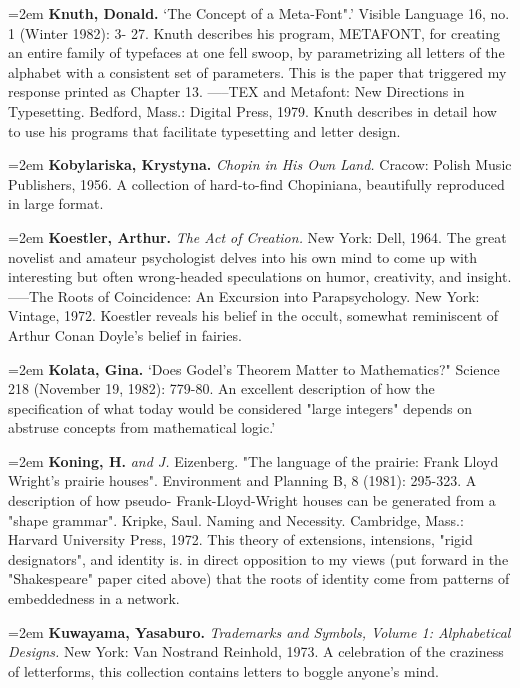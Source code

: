 \par\noindent\hangindent=2em {\bf Knuth, Donald.} `The Concept of a Meta-Font".' Visible Language 16, no. 1 (Winter 1982): 3- 27. Knuth describes his program, METAFONT, for creating an entire family of typefaces at one fell swoop, by parametrizing all letters of the alphabet with a consistent set of parameters. This is the paper that triggered my response printed as Chapter 13. -----TEX and Metafont: New Directions in Typesetting. Bedford, Mass.: Digital Press, 1979. Knuth describes in detail how to use his programs that facilitate typesetting and letter design.

\par\noindent\hangindent=2em {\bf Kobylariska, Krystyna.} {\it Chopin in His Own Land.} Cracow: Polish Music Publishers, 1956. A collection of hard-to-find Chopiniana, beautifully reproduced in large format.

\par\noindent\hangindent=2em {\bf Koestler, Arthur.} {\it The Act of Creation.} New York: Dell, 1964. The great novelist and amateur psychologist delves into his own mind to come up with interesting but often wrong-headed speculations on humor, creativity, and insight. -----The Roots of Coincidence: An Excursion into Parapsychology. New York: Vintage, 1972. Koestler reveals his belief in the occult, somewhat reminiscent of Arthur Conan Doyle's belief in fairies.

\par\noindent\hangindent=2em {\bf Kolata, Gina.} `Does Godel's Theorem Matter to Mathematics?" Science 218 (November 19, 1982): 779-80. An excellent description of how the specification of what today would be considered "large integers" depends on abstruse concepts from mathematical logic.' 

\par\noindent\hangindent=2em {\bf Koning, H.} {\it and J.} Eizenberg. "The language of the prairie: Frank Lloyd Wright's prairie houses". Environment and Planning B, 8 (1981): 295-323. A description of how pseudo- Frank-Lloyd-Wright houses can be generated from a "shape grammar". Kripke, Saul. Naming and Necessity. Cambridge, Mass.: Harvard University Press, 1972. This theory of extensions, intensions, "rigid designators", and identity is. in direct opposition to my views (put forward in the "Shakespeare" paper cited above) that the roots of identity come from patterns of embeddedness in a network.

\par\noindent\hangindent=2em {\bf Kuwayama, Yasaburo.} {\it Trademarks and Symbols, Volume 1: Alphabetical Designs.} New York: Van Nostrand Reinhold, 1973. A celebration of the craziness of letterforms, this collection contains letters to boggle anyone's mind.

